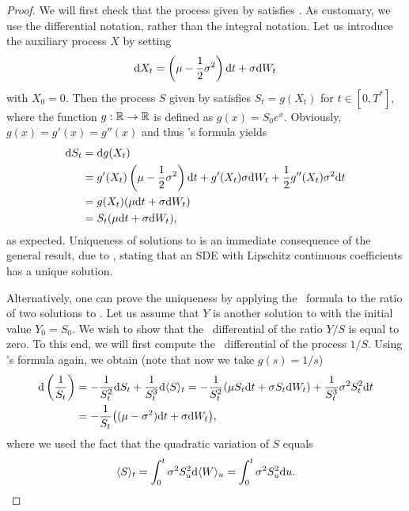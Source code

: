 \begin{proof}
	We will first check that the process given by  satisfies . As customary, we use the differential notation, rather than the integral notation. Let us introduce the auxiliary process \(X\) by setting
	\begin{equation*}
		\mathrm{d} X_t = \left(\mu - \frac{1}{2}\sigma^2\right) \mathrm{d} t + \sigma \mathrm{d} W_t
	\end{equation*}
	with \(X_0 = 0\). Then the process \(S\) given by  satisfies \(S_t = g(X_t)\) for \(t \in [0, T^*]\), where the function \(g : \mathbb{R} \to \mathbb{R}\) is defined as \(g(x) = S_0 e^x\). Obviously, \(g(x) = g'(x) = g''(x)\) and thus \Ito's formula yields
	\begin{align*}
		\mathrm{d} S_t & = \mathrm{d} g(X_t)                                                                                                      \\
		        & = g'(X_t)\left(\mu - \frac{1}{2}\sigma^2\right) \mathrm{d} t + g'(X_t)\sigma \mathrm{d} W_t + \frac{1}{2}g''(X_t)\sigma^2 \mathrm{d} t \\
		        & = g(X_t)(\mu \mathrm{d} t + \sigma \mathrm{d} W_t)                                                                              \\
		        & = S_t(\mu \mathrm{d} t + \sigma \mathrm{d} W_t),
	\end{align*}
	as expected. Uniqueness of solutions to  is an immediate consequence of the general result, due to \Ito, stating that an SDE with Lipschitz continuous coefficients has a unique solution.

	Alternatively, one can prove the uniqueness by applying the \Ito\ formula to the ratio of two solutions to . Let us assume that \(Y\) is another solution to  with the initial value \(Y_0 = S_0\). We wish to show that the \Ito\ differential of the ratio \(Y/S\) is equal to zero. To this end, we will first compute the \Ito\ differential of the process \(1/S\). Using \Ito's formula again, we obtain (note that now we take \(g(s) = 1/s\))
	\begin{align*}
		\mathrm{d} \left(\frac{1}{S_t}\right) & = -\frac{1}{S_t^2} \mathrm{d} S_t + \frac{1}{S_t^3} \mathrm{d} \langle S \rangle_t = -\frac{1}{S_t^2} (\mu S_t \mathrm{d} t + \sigma S_t \mathrm{d} W_t) + \frac{1}{S_t^3} \sigma^2 S_t^2 \mathrm{d} t \\
		                               & = -\frac{1}{S_t} \bigl((\mu - \sigma^2) \mathrm{d} t + \sigma \mathrm{d} W_t \bigr),
	\end{align*}
	where we used the fact that the quadratic variation of \(S\) equals
	\begin{equation} \label{eq:QuadraticVariationS}
		\langle S \rangle_t = \int_0^t \sigma^2 S_u^2 \mathrm{d} \langle W \rangle_u = \int_0^t \sigma^2 S_u^2 \mathrm{d} u.
	\end{equation}


\end{proof}
